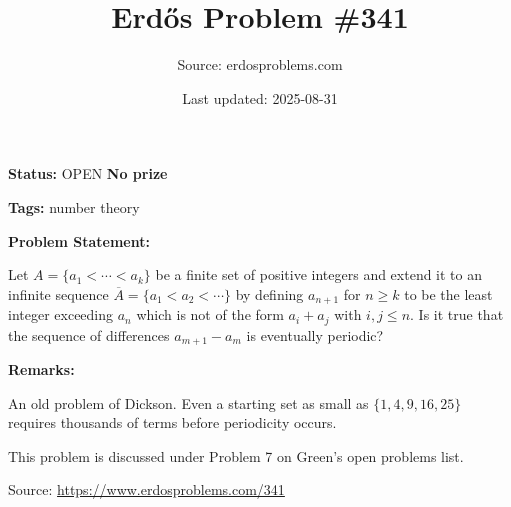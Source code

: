 \documentclass{article}
\title{Erd\H{o}s Problem \#341}
\date{Last updated: 2025-08-31}
\author{Source: erdosproblems.com}
\begin{document}
\maketitle

\noindent\textbf{Status:} OPEN \quad \textbf{No prize}

\noindent\textbf{Tags:} number theory

\medskip
\noindent\textbf{Problem Statement:}

Let $A=\{a_1<\cdots<a_k\}$ be a finite set of positive integers and extend it to an infinite sequence $\overline{A}=\{a_1<a_2<\cdots \}$ by defining $a_{n+1}$ for $n\geq k$ to be the least integer exceeding $a_n$ which is not of the form $a_i+a_j$ with $i,j\leq n$. Is it true that the sequence of differences $a_{m+1}-a_m$ is eventually periodic?

\bigskip
\noindent\textbf{Remarks:}

An old problem of Dickson. Even a starting set as small as $\{1,4,9,16,25\}$ requires thousands of terms before periodicity occurs.

This problem is discussed under Problem 7 on Green's open problems list.

\bigskip
\noindent\small{Source: \url{https://www.erdosproblems.com/341}}
\end{document}
